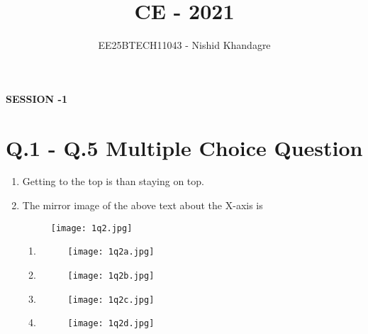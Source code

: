 \documentclass[journal,12pt,onecolumn]{article}
\theoremstyle{remark}
\begin{document}
\title{CE - 2021}
\author{EE25BTECH11043 - Nishid Khandagre}
\date{}
\maketitle

\renewcommand{\thefigure}{\theenumi}
\renewcommand{\thetable}{\theenumi}

\textbf{SESSION -1}
\section*{Q.1 - Q.5 Multiple Choice Question}
\begin{enumerate}
\item Getting to the top is \underline{\hspace{2cm}} than staying on top.

\hfill{}
\begin{enumerate}
\end{enumerate}

\item The mirror image of the above text about the X-axis is
\begin{figure}[H]
        \centering
        \texttt{[image: 1q2.jpg]}
        \caption{}
        \label{fig:2}
    \end{figure}
\hfill{}
\begin{multicols}{2}
\begin{enumerate}
    \item 
    \begin{figure}[H]
        \centering
        \texttt{[image: 1q2a.jpg]}
        \caption{}
        \label{fig:a2A}
    \end{figure}
    \item 
    \begin{figure}[H]
        \centering
        \texttt{[image: 1q2b.jpg]}
        \caption{}
        \label{fig:a2B}
    \end{figure}
    \item 
    \begin{figure}[H]
        \centering
        \texttt{[image: 1q2c.jpg]}
        \caption{}
        \label{fig:a2C}
    \end{figure}
    \item 
    \begin{figure}[H]
        \centering
        \texttt{[image: 1q2d.jpg]}
        \caption{}
        \label{fig:a2D}
    \end{figure}
\end{enumerate}
\end{multicols}


\end{enumerate}
\end{document}
